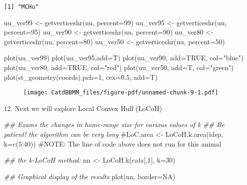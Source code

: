 \documentclass[
  letterpaper,
]{book}
\newenvironment{Shaded}{\begin{snugshade}}{\end{snugshade}}
\newcommand{\AttributeTok}[1]{\textcolor[rgb]{0.40,0.45,0.13}{#1}}
\newcommand{\CommentTok}[1]{\textcolor[rgb]{0.37,0.37,0.37}{#1}}
\newcommand{\ConstantTok}[1]{\textcolor[rgb]{0.56,0.35,0.01}{#1}}
\newcommand{\DecValTok}[1]{\textcolor[rgb]{0.68,0.00,0.00}{#1}}
\newcommand{\DocumentationTok}[1]{\textcolor[rgb]{0.37,0.37,0.37}{\textit{#1}}}
\newcommand{\FloatTok}[1]{\textcolor[rgb]{0.68,0.00,0.00}{#1}}
\newcommand{\FunctionTok}[1]{\textcolor[rgb]{0.28,0.35,0.67}{#1}}
\newcommand{\NormalTok}[1]{\textcolor[rgb]{0.00,0.23,0.31}{#1}}
\newcommand{\OtherTok}[1]{\textcolor[rgb]{0.00,0.23,0.31}{#1}}
\newcommand{\StringTok}[1]{\textcolor[rgb]{0.13,0.47,0.30}{#1}}
\begin{document}
\begin{verbatim}
[1] "MCHu"
\end{verbatim}

\begin{Shaded}
\begin{Highlighting}[]
\NormalTok{uu\_ver99 }\OtherTok{\textless{}{-}} \FunctionTok{getverticeshr}\NormalTok{(uu, }\AttributeTok{percent=}\DecValTok{99}\NormalTok{)}
\NormalTok{uu\_ver95 }\OtherTok{\textless{}{-}} \FunctionTok{getverticeshr}\NormalTok{(uu, }\AttributeTok{percent=}\DecValTok{95}\NormalTok{)}
\NormalTok{uu\_ver90 }\OtherTok{\textless{}{-}} \FunctionTok{getverticeshr}\NormalTok{(uu, }\AttributeTok{percent=}\DecValTok{90}\NormalTok{)}
\NormalTok{uu\_ver80 }\OtherTok{\textless{}{-}} \FunctionTok{getverticeshr}\NormalTok{(uu, }\AttributeTok{percent=}\DecValTok{80}\NormalTok{)}
\NormalTok{uu\_ver50 }\OtherTok{\textless{}{-}} \FunctionTok{getverticeshr}\NormalTok{(uu, }\AttributeTok{percent=}\DecValTok{50}\NormalTok{)}

\FunctionTok{plot}\NormalTok{(uu\_ver99)}
\FunctionTok{plot}\NormalTok{(uu\_ver95,}\AttributeTok{add=}\NormalTok{T)}
\FunctionTok{plot}\NormalTok{(uu\_ver90, }\AttributeTok{add=}\ConstantTok{TRUE}\NormalTok{, }\AttributeTok{col=}\StringTok{"blue"}\NormalTok{)}
\FunctionTok{plot}\NormalTok{(uu\_ver80, }\AttributeTok{add=}\ConstantTok{TRUE}\NormalTok{, }\AttributeTok{col=}\StringTok{"red"}\NormalTok{)}
\FunctionTok{plot}\NormalTok{(uu\_ver50, }\AttributeTok{add=}\NormalTok{T, }\AttributeTok{col=}\StringTok{"green"}\NormalTok{)}
\FunctionTok{plot}\NormalTok{(}\FunctionTok{st\_geometry}\NormalTok{(coords),}\AttributeTok{pch=}\DecValTok{1}\NormalTok{, }\AttributeTok{cex=}\FloatTok{0.5}\NormalTok{, }\AttributeTok{add=}\NormalTok{T)}
\end{Highlighting}
\end{Shaded}

\begin{figure}[H]

{\centering \texttt{[image: CatdBBMM\_files/figure-pdf/unnamed-chunk-9-1.pdf]}

}

\end{figure}

12. Next we will explore Local Convex Hull (LoCoH)

\begin{Shaded}
\begin{Highlighting}[]
\DocumentationTok{\#\# Exams the changes in home{-}range size for various values of k}
\DocumentationTok{\#\# Be patient! the algorithm can be very long}
\CommentTok{\#LoC.area \textless{}{-} LoCoH.k.area(idsp, k=c(5:40))}
\CommentTok{\#NOTE: The line of code above does not run for this animal}

\DocumentationTok{\#\# the k{-}LoCoH method:}
\NormalTok{nn }\OtherTok{\textless{}{-}} \FunctionTok{LoCoH.k}\NormalTok{(cats[,}\DecValTok{1}\NormalTok{], }\AttributeTok{k=}\DecValTok{30}\NormalTok{)}

\DocumentationTok{\#\# Graphical display of the results}
\FunctionTok{plot}\NormalTok{(nn, }\AttributeTok{border=}\ConstantTok{NA}\NormalTok{)}
\end{Highlighting}
\end{Shaded}
\end{document}
